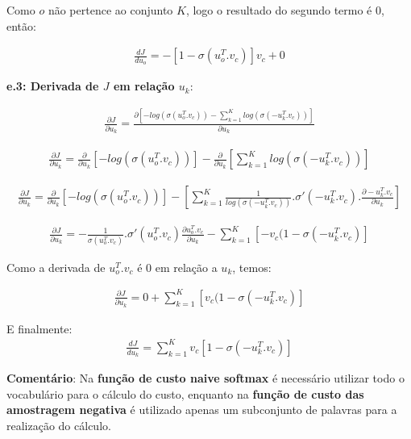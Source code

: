 \documentclass[a4paper,12pt]{article}
\begin{document}
Como $o$ não pertence ao conjunto $K$, logo o resultado do segundo termo é $0$, então:

\begin{align}
\frac{dJ}{du_o} =  - [1- \sigma(  u_o^T . v_c ) ] v_c + 0
\end{align}
\noindent



\textbf{e.3: Derivada de $J$ em relação $u_k$}:

\begin{align}
\frac{\partial J}{\partial u_k} = \frac{\partial [ -log( \sigma(  u_o^T . v_c ) ) - \sum_{k = 1}^K log( \sigma( - u_k^T . v_c ) ) ]}{\partial u_k}
\end{align}


\begin{align}
\frac{\partial J}{\partial u_k} = \frac{\partial}{\partial u_k} [ -log( \sigma(  u_o^T . v_c ) )] -\frac{\partial}{\partial u_k} [\sum_{k = 1}^K log( \sigma( - u_k^T . v_c ) ) ] 
\end{align}

\begin{align}
\frac{\partial J}{\partial u_k} = \frac{\partial}{\partial u_k} [ -log( \sigma(  u_o^T . v_c ) )] - [\sum_{k = 1}^K \frac{1}{log( \sigma( - u_k^T . v_c ) )} .\sigma'( - u_k^T . v_c ). \frac{\partial - u_k^T . v_c }{\partial u_k} ]
\end{align}


\begin{align}
\frac{\partial J}{\partial u_k} = -  \frac{1}{\sigma(  u_o^T . v_c )} . \sigma'(  u_o^T . v_c )  \frac{\partial u_o^T . v_c}{ \partial u_k } - \sum_{k = 1}^K [-v_c (1 - \sigma( - u_k^T . v_c )] 
\end{align}

Como a derivada de $u_o^T . v_c$ é 0 em relação a $u_k$, temos:

\begin{align}
\frac{\partial J}{\partial u_k} = 0 + \sum_{k = 1}^K [v_c (1 - \sigma( - u_k^T . v_c )]
\end{align}

E finalmente:
\begin{align}
\frac{dJ}{du_k} =  \sum_{k = 1}^K v_c [1- \sigma( -  u_k^T . v_c ) ]
\end{align}
\noindent

\textbf{Comentário}: Na \textbf{função de custo naive softmax} é necessário utilizar todo o vocabulário para o cálculo do custo, enquanto na \textbf{função de custo das amostragem negativa} é utilizado apenas um subconjunto de palavras para a realização do cálculo.
\end{document}

